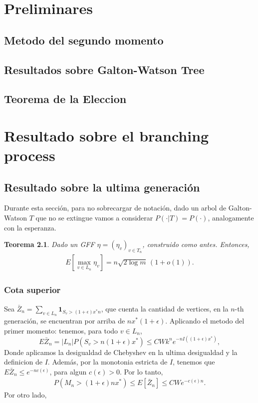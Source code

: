 \documentclass[12pt]{report}
\newtheorem{theorem}{Teorema}  %
\begin{document}
\tableofcontents
\newpage

\chapter{Preliminares}
\section{Metodo del segundo momento}
\section{Resultados sobre Galton-Watson Tree}
\section{Teorema de la Eleccion}

\chapter{Resultado sobre el branching process}
\section{Resultado sobre la ultima generación}
Durante esta sección, para no sobrecargar de notación, dado un arbol de Galton-Watson $T$ que no se extingue 
vamos a considerar $P(\cdot|T) = P(\cdot)$, analogamente con la esperanza.
\begin{theorem}
Dado un GFF $\eta = (\eta_{v})_{v \in T_{n}}$, construido como antes. Entonces,
\begin{align} 
E[\max_{v \in L_n} \eta_v] = n\sqrt{2\log m} \, (1 + o(1)).
\end{align}
\end{theorem}

\subsection{Cota superior}

Sea $\bar{Z}_n = \sum_{v \in L_n} \mathbf{1}_{S_v > (1 + \epsilon)x^* n}$, 
que cuenta la cantidad de vertices, en la $n$-th generación, 
se encuentran por arriba de $n x^*(1 + \epsilon)$. Aplicando el metodo del primer momento: 
tenemos, para todo $v \in L_n$,
\[
E\bar{Z}_n = |L_n| P(S_v > n(1 + \epsilon)x^*) \leq CW k^n e^{-n I((1 + \epsilon)x^*)},
\]
Donde aplicamos la desigualdad de Chebyshev en la ultima desigualdad y la definicion de $I$. Además, por 
la monotonia estricta de $I$, tenemos que $E \bar{Z}_n \leq e^{-n c(\epsilon)}$, 
para algun $c(\epsilon) > 0$. Por lo tanto,
\begin{align}
P(M_n > (1 + \epsilon) n x^*) \leq E [\bar{Z}_n] \leq CWe^{-c(\epsilon)n}.
\end{align}
Por otro lado,
\end{document}
